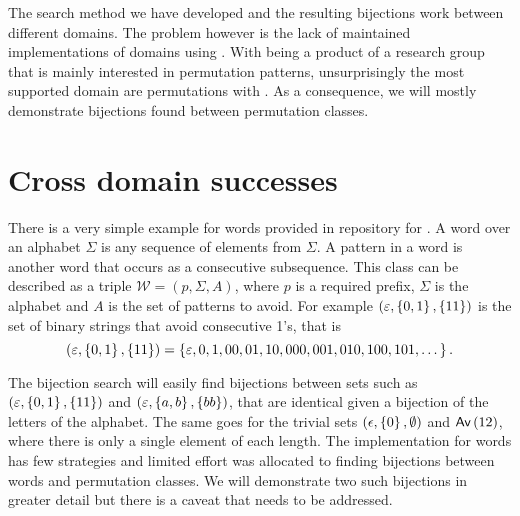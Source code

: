 
\label{ch:results}
The search method we have developed and the resulting bijections work between different domains. The problem however is the lack of maintained implementations of domains using \css{}. With \css{} being a product of a research group that is mainly interested in permutation patterns, unsurprisingly the most supported domain are permutations with \tsc{}. As a consequence, we will mostly demonstrate bijections found between permutation classes.

\section{Cross domain successes}
There is a very simple example for words provided in repository for \css{}. A word over an alphabet $\Sigma$ is any sequence of elements from $\Sigma$. A pattern in a word is another word that occurs as a consecutive subsequence. This class can be described as a triple $\mathcal{W} = (p, \Sigma, A)$, where $p$ is a required prefix, $\Sigma$ is the alphabet and $A$ is the set of patterns to avoid. For example $(\varepsilon, \left\{0,1\right\}, \left\{11\right\})$ is the set of binary strings that avoid consecutive 1's, that is
\[
    (\varepsilon, \left\{0,1\right\}, \left\{11\right\}) = \left\{\varepsilon, 0, 1, 00, 01, 10, 000, 001, 010, 100, 101, \dotsc\right\}.
\]


The bijection search will easily find bijections between sets such as $(\varepsilon, \left\{0,1\right\}, \left\{11\right\})$ and $(\varepsilon, \left\{a,b\right\}, \left\{bb\right\})$, that are identical given a bijection of the letters of the alphabet. The same goes for the trivial sets $(\epsilon, \left\{0\right\}, \emptyset)$ and $\textsf{Av}\left(12\right)$, where there is only a single element of each length. The implementation for words has few strategies and limited effort was allocated to finding bijections between words and permutation classes. We will demonstrate two such bijections in greater detail but there is a caveat that needs to be addressed.

